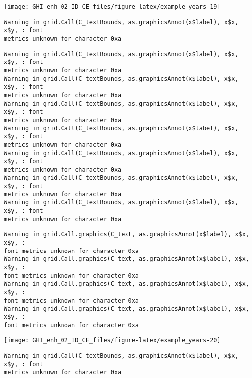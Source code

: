 \documentclass[
  10pt,
  a4paper,oneside]{article}
\begin{document}
\begin{center}\texttt{[image: GHI\_enh\_02\_ID\_CE\_files/figure-latex/example\_years-19]} \end{center}

\begin{verbatim}
Warning in grid.Call(C_textBounds, as.graphicsAnnot(x$label), x$x, x$y, : font
metrics unknown for character 0xa
\end{verbatim}

\begin{verbatim}
Warning in grid.Call(C_textBounds, as.graphicsAnnot(x$label), x$x, x$y, : font
metrics unknown for character 0xa
Warning in grid.Call(C_textBounds, as.graphicsAnnot(x$label), x$x, x$y, : font
metrics unknown for character 0xa
Warning in grid.Call(C_textBounds, as.graphicsAnnot(x$label), x$x, x$y, : font
metrics unknown for character 0xa
Warning in grid.Call(C_textBounds, as.graphicsAnnot(x$label), x$x, x$y, : font
metrics unknown for character 0xa
Warning in grid.Call(C_textBounds, as.graphicsAnnot(x$label), x$x, x$y, : font
metrics unknown for character 0xa
Warning in grid.Call(C_textBounds, as.graphicsAnnot(x$label), x$x, x$y, : font
metrics unknown for character 0xa
Warning in grid.Call(C_textBounds, as.graphicsAnnot(x$label), x$x, x$y, : font
metrics unknown for character 0xa
\end{verbatim}

\begin{verbatim}
Warning in grid.Call.graphics(C_text, as.graphicsAnnot(x$label), x$x, x$y, :
font metrics unknown for character 0xa
Warning in grid.Call.graphics(C_text, as.graphicsAnnot(x$label), x$x, x$y, :
font metrics unknown for character 0xa
Warning in grid.Call.graphics(C_text, as.graphicsAnnot(x$label), x$x, x$y, :
font metrics unknown for character 0xa
Warning in grid.Call.graphics(C_text, as.graphicsAnnot(x$label), x$x, x$y, :
font metrics unknown for character 0xa
\end{verbatim}

\begin{center}\texttt{[image: GHI\_enh\_02\_ID\_CE\_files/figure-latex/example\_years-20]} \end{center}

\begin{verbatim}
Warning in grid.Call(C_textBounds, as.graphicsAnnot(x$label), x$x, x$y, : font
metrics unknown for character 0xa
\end{verbatim}
\end{document}
